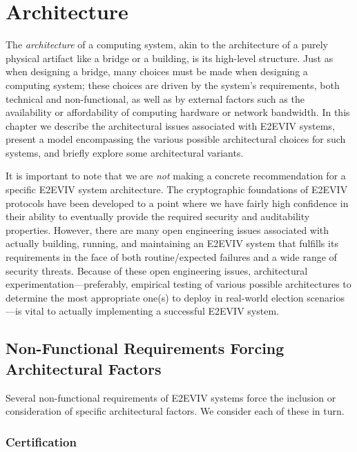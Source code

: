 \chapter{Architecture}
\label{chapter:architecture}

The \emph{architecture} of a computing system, akin to the
architecture of a purely physical artifact like a bridge or a
building, is its high-level structure. Just as when designing a
bridge, many choices must be made when designing a computing system;
these choices are driven by the system's requirements, both technical
and non-functional, as well as by external factors such as the
availability or affordability of computing hardware or network
bandwidth. In this chapter we describe the architectural issues
associated with E2EVIV systems, present a model encompassing the
various possible architectural choices for such systems, and briefly
explore some architectural variants.

It is important to note that we are \emph{not} making a concrete
recommendation for a specific E2EVIV system architecture. The
cryptographic foundations of E2EVIV protocols have been developed to a
point where we have fairly high confidence in their ability to
eventually provide the required security and auditability
properties. However, there are many open engineering issues associated
with actually building, running, and maintaining an E2EVIV system that
fulfills its requirements in the face of both routine/expected
failures and a wide range of security threats. Because of these open
engineering issues, architectural experimentation---preferably,
empirical testing of various possible architectures to determine the
most appropriate one(s) to deploy in real-world election
scenarios---is vital to actually implementing a successful E2EVIV
system.

\section{Non-Functional Requirements Forcing Architectural Factors}

Several non-functional requirements of E2EVIV systems force the
inclusion or consideration of specific architectural factors. We
consider each of these in turn.

\subsection{Certification}

